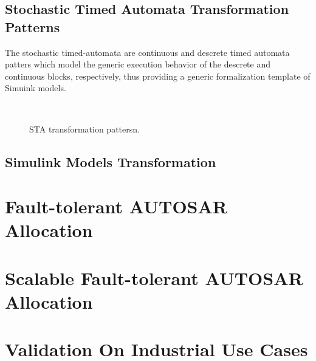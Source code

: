 \subsection{Stochastic Timed Automata Transformation Patterns}
The stochastic timed-automata are continuous and descrete timed automata patters which model the generic execution behavior of the descrete and continuous blocks, respectively, thus providing a generic formalization template of Simuink models.
\begin{figure}[] 
	\centering
{} ~
\caption{STA transformation pattersn.} 
\end{figure}

\subsection{Simulink Models Transformation }

\section{Fault-tolerant AUTOSAR Allocation}
\section{Scalable Fault-tolerant AUTOSAR Allocation }
\section{Validation On Industrial Use Cases}
